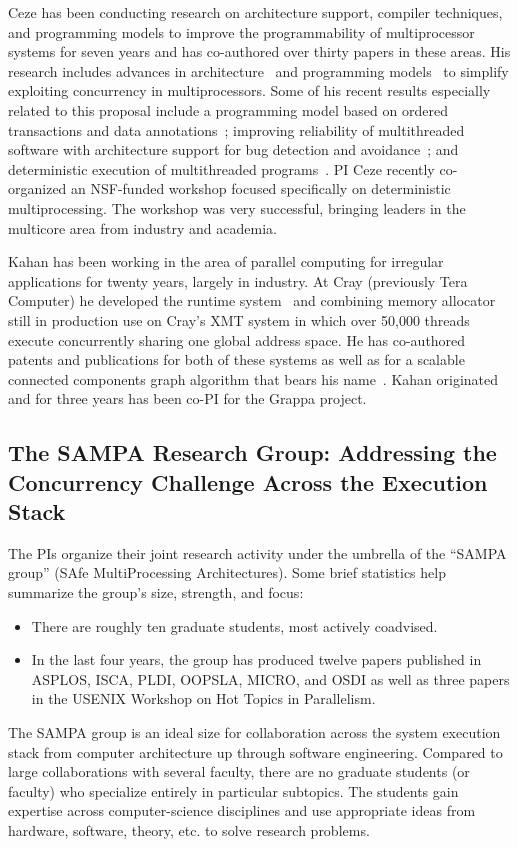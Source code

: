 Ceze has been conducting research on architecture support, compiler techniques, and programming models to improve the programmability of multiprocessor systems for seven years and has co-authored over thirty papers in these areas.  His research includes advances in architecture~\cite{tlsooo, bulk, bulksc, swbulk, cyclops, dmp, delorean} and programming models~\cite{colorama, ipot, posh} to simplify exploiting concurrency in multiprocessors. Some of his recent results especially related to this proposal include a programming model based on ordered transactions and data annotations~\cite{ipot}; improving reliability of multithreaded software with architecture support for bug detection and avoidance~\cite{atomaid, aatoppicks, bugaboo, oshajava, cs-isca10, ce-isca10}; and deterministic execution of multithreaded programs~\cite{dmp, dmptoppicks, asplos10coredet, dmpos}. PI Ceze recently co-organized an NSF-funded workshop focused specifically on deterministic multiprocessing. The workshop was very successful, bringing leaders in the multicore area from industry and academia.

Kahan has been working in the area of parallel computing for irregular applications for twenty years, largely in industry.  At Cray (previously Tera Computer) he developed the runtime system~\cite{Alverson95schedulingon,Alverson97terahardware-software} and combining memory allocator~\cite{MAMA} still in production use on Cray's XMT system in which over 50,000 threads execute concurrently sharing one global address space.  He has co-authored patents and publications for both of these systems as well as for a scalable connected components graph algorithm that bears his name~\cite{Underwood07analyzingthe}. Kahan originated and for three years has been co-PI for the Grappa project.

\subsection*{The SAMPA Research Group: Addressing the Concurrency
  Challenge Across the Execution Stack}

The PIs organize their joint research activity under the umbrella of
the ``SAMPA group'' (SAfe MultiProcessing Architectures).  Some brief
statistics help summarize the group's size, strength, and focus:
\begin{itemize}
\item There are roughly ten graduate students, most actively
  coadvised.
\item In the last four years, the group has produced twelve papers
  published in ASPLOS, ISCA, PLDI, OOPSLA, MICRO, and OSDI as well as three
  papers in the USENIX Workshop on Hot Topics in Parallelism.
\end{itemize}
The SAMPA group is an ideal size for collaboration across the system
execution stack from computer architecture up through software
engineering.  Compared to large collaborations with several faculty,
there are no graduate students (or faculty) who specialize entirely in
particular subtopics.  The students gain expertise across
computer-science disciplines and use appropriate ideas from hardware,
software, theory, etc. to solve research problems.  

